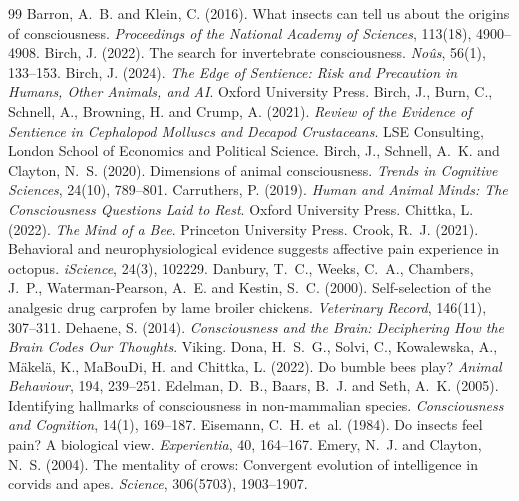 \documentclass{situationist-preprint}
\begin{document}
\begin{thebibliography}{99}\small
{} Barron, A.~B. and Klein, C. (2016). What insects can tell us about the origins of consciousness. \emph{Proceedings of the National Academy of Sciences}, 113(18), 4900--4908.
 Birch, J. (2022). The search for invertebrate consciousness. \emph{No\^us}, 56(1), 133--153.
 Birch, J. (2024). \emph{The Edge of Sentience: Risk and Precaution in Humans, Other Animals, and AI}. Oxford University Press.
 Birch, J., Burn, C., Schnell, A., Browning, H. and Crump, A. (2021). \emph{Review of the Evidence of Sentience in Cephalopod Molluscs and Decapod Crustaceans}. LSE Consulting, London School of Economics and Political Science.
 Birch, J., Schnell, A.~K. and Clayton, N.~S. (2020). Dimensions of animal consciousness. \emph{Trends in Cognitive Sciences}, 24(10), 789--801.
 Carruthers, P. (2019). \emph{Human and Animal Minds: The Consciousness Questions Laid to Rest}. Oxford University Press.
 Chittka, L. (2022). \emph{The Mind of a Bee}. Princeton University Press.
 Crook, R.~J. (2021). Behavioral and neurophysiological evidence suggests affective pain experience in octopus. \emph{iScience}, 24(3), 102229.
 Danbury, T.~C., Weeks, C.~A., Chambers, J.~P., Waterman-Pearson, A.~E. and Kestin, S.~C. (2000). Self-selection of the analgesic drug carprofen by lame broiler chickens. \emph{Veterinary Record}, 146(11), 307--311.
 Dehaene, S. (2014). \emph{Consciousness and the Brain: Deciphering How the Brain Codes Our Thoughts}. Viking.
 Dona, H.~S.~G., Solvi, C., Kowalewska, A., M\"akel\"a, K., MaBouDi, H. and Chittka, L. (2022). Do bumble bees play? \emph{Animal Behaviour}, 194, 239--251.
 Edelman, D.~B., Baars, B.~J. and Seth, A.~K. (2005). Identifying hallmarks of consciousness in non-mammalian species. \emph{Consciousness and Cognition}, 14(1), 169--187.
 Eisemann, C.~H. et~al. (1984). Do insects feel pain? A biological view. \emph{Experientia}, 40, 164--167.
 Emery, N.~J. and Clayton, N.~S. (2004). The mentality of crows: Convergent evolution of intelligence in corvids and apes. \emph{Science}, 306(5703), 1903--1907.

\end{thebibliography}
\end{document}
